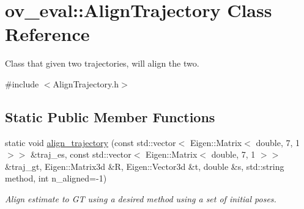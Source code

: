 \hypertarget{classov__eval_1_1AlignTrajectory}{}\section{ov\+\_\+eval\+:\+:Align\+Trajectory Class Reference}
\label{classov__eval_1_1AlignTrajectory}


Class that given two trajectories, will align the two.  




{\ttfamily \#include $<$Align\+Trajectory.\+h$>$}

\subsection*{Static Public Member Functions}
\begin{DoxyCompactItemize}
\item 
static void \hyperlink{classov__eval_1_1AlignTrajectory_ac4ea2100e9e28dc54299569b97b698a3}{align\+\_\+trajectory} (const std\+::vector$<$ Eigen\+::\+Matrix$<$ double, 7, 1 $>$$>$ \&traj\+\_\+es, const std\+::vector$<$ Eigen\+::\+Matrix$<$ double, 7, 1 $>$$>$ \&traj\+\_\+gt, Eigen\+::\+Matrix3d \&R, Eigen\+::\+Vector3d \&t, double \&s, std\+::string method, int n\+\_\+aligned=-\/1)
\begin{DoxyCompactList}\small\item\em Align estimate to GT using a desired method using a set of initial poses. \end{DoxyCompactList}\end{DoxyCompactItemize}
